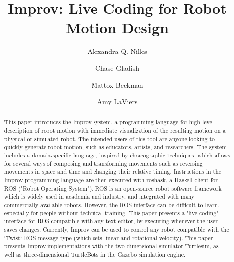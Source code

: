 \documentclass[sigconf]{acmart}
\begin{document}
\title{Improv: Live Coding for Robot Motion Design}


\author{Alexandra Q. Nilles}

\author{Chase Gladish}

\author{Mattox Beckman}

\author{Amy LaViers}

\renewcommand{\shortauthors}{A. Nilles et al.}

\begin{abstract}
This paper introduces the Improv system, a programming language for high-level
description of robot motion with immediate visualization of the
resulting motion on a physical or simulated robot. The intended users of this
tool are anyone looking to quickly generate robot motion, such as educators,
artists, and researchers. The system includes a domain-specific language,
inspired by choreographic techniques, which allows for several ways of composing
and transforming movements such as reversing movements in space and time and
changing their relative timing. Instructions in the Improv programming language
are then executed with roshask, a Haskell client for ROS ("Robot Operating
System"). ROS is an open-source robot software framework which is widely used in
academia and industry, and integrated with many commercially available robots.
However, the ROS interface can be difficult to learn, especially for people
without technical training. This paper presents a "live coding" interface for
ROS compatible with any text editor, by executing whenever the user saves
changes. Currently, Improv can be used to control any robot compatible with the
`Twist` ROS message type (which sets linear and rotational velocity). This paper
presents Improv implementations with the two-dimensional simulator
Turtlesim, as well as three-dimensional TurtleBots in the Gazebo simulation
engine.
\end{abstract}
\end{document}

